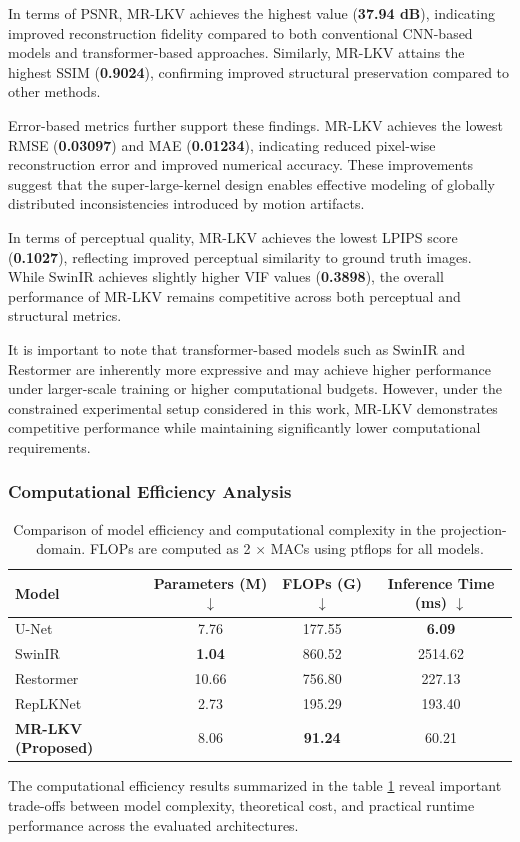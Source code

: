 In terms of PSNR, MR-LKV achieves the highest value (\textbf{37.94 dB}), indicating improved reconstruction fidelity compared to both conventional CNN-based models and transformer-based approaches. Similarly, MR-LKV attains the highest SSIM (\textbf{0.9024}), confirming improved structural preservation compared to other methods.

Error-based metrics further support these findings. MR-LKV achieves the lowest RMSE (\textbf{0.03097}) and MAE (\textbf{0.01234}), indicating reduced pixel-wise reconstruction error and improved numerical accuracy. These improvements suggest that the super-large-kernel design enables effective modeling of globally distributed inconsistencies introduced by motion artifacts.

In terms of perceptual quality, MR-LKV achieves the lowest LPIPS score (\textbf{0.1027}), reflecting improved perceptual similarity to ground truth images. While SwinIR achieves slightly higher VIF values (\textbf{0.3898}), the overall performance of MR-LKV remains competitive across both perceptual and structural metrics.

It is important to note that transformer-based models such as SwinIR and Restormer are inherently more expressive and may achieve higher performance under larger-scale training or higher computational budgets. However, under the constrained experimental setup considered in this work, MR-LKV demonstrates competitive performance while maintaining significantly lower computational requirements.



\subsubsection{Computational Efficiency Analysis }
\begin{table}[H]
\centering
\caption{Comparison of model efficiency and computational complexity in the projection-domain. FLOPs are computed as 2 × MACs using ptflops for all models.}
\label{tab:efficiency_comparison_-projection}
\begin{tabular}{lccc}
\toprule
\rowcolor{gray!20}
Model & Parameters (M) $\downarrow$ & FLOPs (G) $\downarrow$ & Inference Time (ms) $\downarrow$ \\
\midrule
U-Net &  7.76&  177.55&  \textbf{6.09}\\
SwinIR &  \textbf{1.04}&  860.52&  2514.62\\
Restormer &  10.66&   756.80&  227.13\\
RepLKNet &  2.73&  195.29&  193.40\\
\rowcolor{green!10} 
\textbf{MR-LKV (Proposed)} &  8.06&  \textbf{91.24}&  60.21\\
\bottomrule
\end{tabular}
\end{table}
The computational efficiency results summarized in the table \ref{tab:efficiency_comparison_-projection} reveal important trade-offs between model complexity, theoretical cost, and practical runtime performance across the evaluated architectures. 

